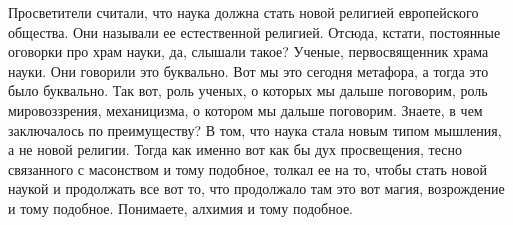 
Просветители считали, что наука должна стать новой религией европейского
общества. Они называли ее естественной религией. Отсюда, кстати, постоянные
оговорки про храм науки, да, слышали такое? Ученые, первосвященник храма науки.
Они говорили это буквально. Вот мы это сегодня метафора, а тогда это было
буквально. Так вот, роль ученых, о которых мы дальше поговорим, роль
мировоззрения, механицизма, о котором мы дальше поговорим. Знаете, в чем
заключалось по преимуществу? В том, что наука стала новым типом мышления, а не
новой религии. Тогда как именно вот как бы дух просвещения, тесно связанного с
масонством и тому подобное, толкал ее на то, чтобы стать новой наукой и
продолжать все вот то, что продолжало там это вот магия, возрождение и тому
подобное. Понимаете, алхимия и тому подобное.

